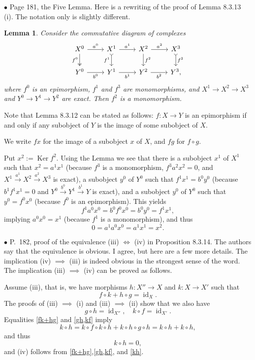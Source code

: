\documentclass[12pt]{article}
\newtheorem{lem}[thm]{Lemma}
\theoremstyle{remark}%
\newcommand{\bu}{\bullet}
\newcommand{\n}{\noindent}
\newcommand{\pf}{\n{\em Proof. }}
\newcommand{\be}{\begin{equation}}
\newcommand{\ee}{\end{equation}}
\newcommand{\bl}{\begin{lem}}
\newcommand{\el}{\end{lem}}
\DeclareMathOperator{\id}{id}
\DeclareMathOperator{\Ker}{Ker}
\begin{document}

\n$\bu$ Page 181, the Five Lemma. Here is a rewriting of the proof of Lemma 8.3.13 (i). The notation only is slightly different. 
%
\bl 
Consider the commutative diagram of complexes 
$$
\begin{tikzcd}
X^0\arrow[two heads]{d}[swap]{f^0}\arrow{r}{a^0}&
X^1\arrow[tail]{d}[swap]{f^1}\arrow{r}{a^1}&
X^2\arrow{d}{f^2}\arrow{r}{a^2}&
X^3\arrow[tail]{d}{f^3}\\ 
Y^0\arrow{r}[swap]{b^0}&
Y^1\arrow{r}[swap]{b^1}&
Y^2\arrow{r}[swap]{b^2}&
Y^3,
\end{tikzcd}
$$
where $f^0$ is an epimorphism, $f^1$ and $f^3$ are monomorphisms, and $X^1\to X^2\to X^3$ and $Y^0\to Y^1\to Y^2$ are exact. Then $f^2$ is a monomorphism. 
\el 
% 
\pf Note that Lemma 8.3.12 can be stated as follows: $f:X\to Y$ is an epimorphism if and only if any subobject of $Y$ is the image of some subobject of $X$. 

We write $fx$ for the image of a subobject $x$ of $X$, and $fg$ for $f\circ g$.

Put $x^2:=\Ker f^2$. Using the Lemma we see that there is a subobject $x^1$ of $X^1$ such that $x^2=a^1x^1$ (because $f^3$ is a monomorphism, $f^3a^2x^2=0$, and $X^1\overset{a^1}{\to}X^2\overset{a^2}{\to}X^3$ is exact), a subobject $y^0$ of $Y^0$ such that $f^1x^1=b^0y^0$ (because $b^1f^1x^1=0$ and $Y^0\overset{b^0}{\to}Y^1\overset{b^1}{\to}Y$ is exact), and a subobject $y^0$ of $Y^0$ such that $y^0=f^0x^0$ (because $f^0$ is an epimorphism). This yields  
$$
f^1a^0x^0=b^0f^0x^0=b^0y^0=f^1x^1,
$$
implying $a^0x^0=x^1$ (because $f^1$ is a monomorphism), and thus 
$$
0=a^1a^0x^0=a^1x^1=x^2.
$$ 


\n$\bu$ P.~182, proof of the equivalence (iii) $\iff$ (iv) in Proposition 8.3.14. The authors say that the equivalence is obvious. I agree, but here are a few more details. The implication (iv) $\implies$ (iii) is indeed obvious in the strongest sense of the word. The implication (iii) $\implies$ (iv) can be proved as follows. 

Assume (iii), that is, we have morphisms $h:X''\to X$ and $k:X\to X'$ such that 
\be\label{fk+hg} 
f\circ k+h\circ g=\id_X.
\ee 
The proofs of (iii) $\implies$ (i) and (iii) $\implies$ (ii) show that we also have 
\be\label{gh,kf} 
g\circ h=\id_{X''},\quad k\circ f=\id_{X'}.
\ee 
Equalities \eqref{fk+hg} and \eqref{gh,kf} imply 
$$
k\circ h=k\circ f\circ k\circ h+k\circ h\circ g\circ h=k\circ h+k\circ h,
$$ 
and thus 
\be\label{kh} 
k\circ h=0, 
\ee 
and (iv) follows from  \eqref{fk+hg},\eqref{gh,kf}, and \eqref{kh}. 
\end{document}
